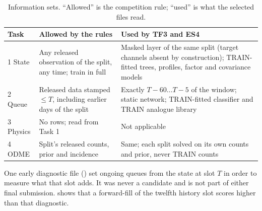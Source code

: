 \begin{table}[h]
\centering\small
\caption{Information sets. ``Allowed'' is the competition rule; ``used'' is what the selected files read.}\label{tab:infosets}
\begin{tabularx}{\linewidth}{@{}l X X@{}}
\toprule
Task & Allowed by the rules & Used by TF3 and ES4 \\
\midrule
1 State & Any released observation of the split, any time; train in full & Masked layer of the same split (target channels absent by construction); TRAIN-fitted trees, profiles, factor and covariance models \\
2 Queue & Released data stamped $\le T$, including earlier days of the split & Exactly $T{-}60\dots T{-}5$ of the window; static network; TRAIN-fitted classifier and TRAIN analogue library \\
3 Physics & No rows; read from Task 1 & Not applicable \\
4 ODME & Split's released counts, prior and incidence & Same; each split solved on its own counts and prior, never TRAIN counts \\
\bottomrule
\end{tabularx}
\end{table}

One early diagnostic file () set ongoing queues from the state at slot $T$ in order to measure what
that slot adds. It was never a candidate and is not part of either final submission.  shows that a
forward-fill of the twelfth history slot scores higher than that diagnostic.

